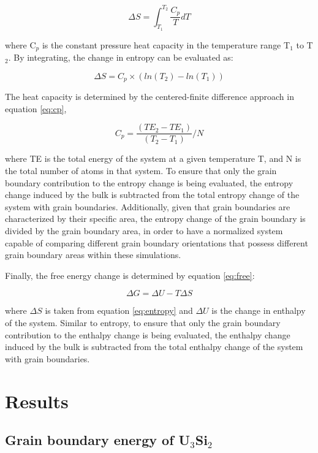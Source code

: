 \documentclass[review]{elsarticle}
\begin{document}
\begin{equation}
\label{eq:entropy}
\Delta S = \int_{T_{1}}^{T_{2}} \frac{C_{p}}{T} dT
\end{equation}

where C$_{p}$ is the constant pressure heat capacity in the temperature range T$_{1}$ to T$_{2}$. By integrating, the change in entropy can be evaluated as:

\begin{equation}
\label{eq:entropy2}
\Delta S = C_{p} \times (ln(T_{2}) - ln(T_{1})) 
\end{equation}

The heat capacity is determined by the centered-finite difference approach in equation \ref{eq:cp},

\begin{equation}
\label{eq:cp}
C_{p} = \frac{(TE_{2} - TE_{1})}{(T_{2} - T_{1})} / N
\end{equation}

where TE is the total energy of the system at a given temperature T, and N is the total number of atoms in that system. To ensure that only the grain boundary contribution to the entropy change is being evaluated, the entropy change induced by the bulk is subtracted from the total entropy change of the system with grain boundaries. Additionally, given that grain boundaries are characterized by their specific area, the entropy change of the grain boundary is divided by the grain boundary area, in order to have a normalized system capable of comparing different grain boundary orientations that possess different grain boundary areas within these simulations. 

Finally, the free energy change is determined by equation \ref{eq:free}:

\begin{equation}
\label{eq:free}
\Delta G = \Delta U - T \Delta S
\end{equation}

where $\Delta S$ is taken from equation \ref{eq:entropy} and $\Delta U$ is the change in enthalpy of the system.  Similar to entropy, to ensure that only the grain boundary contribution to the enthalpy change is being evaluated, the enthalpy change induced by the bulk is subtracted from the total enthalpy change of the system with grain boundaries.

\section{Results}
\subsection{Grain boundary energy of U$_{3}$Si$_{2}$}
\end{document}
